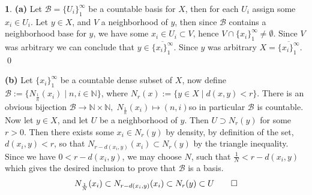 \documentclass[10.5pt]{article}
\theoremstyle{definition}
\newtheorem{pb}{}
\newcommand{\set}[1]{\{#1\}}
\begin{document}
    \begin{pb}
        \textbf{(a)} Let \(\mathcal{B} = \set{U_i}_1^\infty\) be a countable basis for \(X\), then for each \(U_i\) assign some \(x_i \in U_i\). Let \(y \in X\), and \(V\) a neighborhood of \(y\), then since \(\mathcal{B}\) contains a neighborhood base for \(y\), we have some \(x_i \in U_i \subset V\), hence \(V \cap \set{x_i}_1^\infty \neq \emptyset\). Since \(V\) was arbitrary we can conclude that \(y \in \overline{\set{x_i}_1^\infty}\). Since \(y\) was arbitrary \(X = \overline{\set{x_i}_1^\infty}\). \qed

        \textbf{(b)} Let \(\set{x_i}_1^\infty\) be a countable dense subset of \(X\), now define \(\mathcal{B}:= \set{N_{\frac{1}{n}}(x_i) \mid n,i \in \mathbb{N}}\), where \(N_r(x) := \set{y \in X \mid d(x,y) < r}\). There is an obvious bijection \(\mathcal{B} \to \mathbb{N}\times \mathbb{N}, \; N_{\frac{1}{n}}(x_i) \mapsto (n,i)\)so in particular \(\mathcal{B}\) is countable. Now let \(y \in X\), and let \(U\) be a neighborhood of \(y\). Then \(U \supset N_{r}(y)\) for some \(r > 0\). Then there exists some \(x_i \in N_r(y)\) by density, by definition of the set, \(d(x_i,y) < r\), so that \(N_{r - d(x_i,y)}(x_i) \subset N_r(y)\) by the triangle inequality. Since we have \(0 < r - d(x_i,y)\), we may choose \(N\), such that \(\frac{1}{N} < r - d(x_i,y)\) which gives the desired inclusion to prove that \(\mathcal{B}\) is a basis.
        \begin{align*}
            N_{\frac{1}{N}}(x_i) \subset N_{r - d(x_i,y)}(x_i) \subset N_r(y) \subset U \qed
        \end{align*}
    \end{pb}
\end{document}
